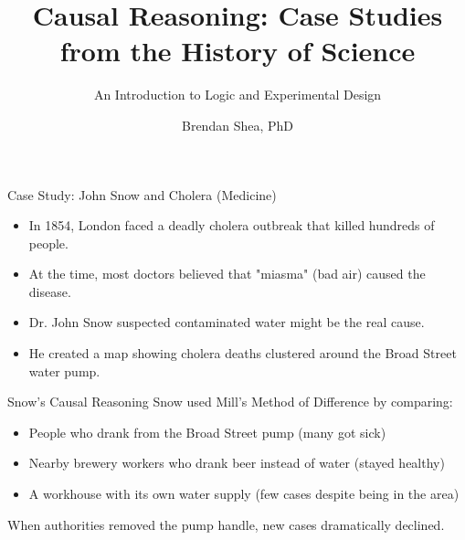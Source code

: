 \documentclass{beamer}
\title{Causal Reasoning: Case Studies from the History of Science}
\subtitle{An Introduction to Logic and Experimental Design}
\author{Brendan Shea, PhD}
\begin{document}
\begin{frame}
    \titlepage
\end{frame}

\begin{frame}{Case Study: John Snow and Cholera (Medicine)}
    \begin{itemize}
        \item In 1854, London faced a deadly cholera outbreak that killed hundreds of people.
        \item At the time, most doctors believed that "miasma" (bad air) caused the disease.
        \item Dr. John Snow suspected contaminated water might be the real cause.
        \item He created a map showing cholera deaths clustered around the Broad Street water pump.
    \end{itemize}
    
    \begin{block}{Snow's Causal Reasoning}
        Snow used Mill's Method of Difference by comparing:
        \begin{itemize}
            \item People who drank from the Broad Street pump (many got sick)
            \item Nearby brewery workers who drank beer instead of water (stayed healthy)
            \item A workhouse with its own water supply (few cases despite being in the area)
        \end{itemize}
        When authorities removed the pump handle, new cases dramatically declined.
    \end{block}
\end{frame}
\end{document}
